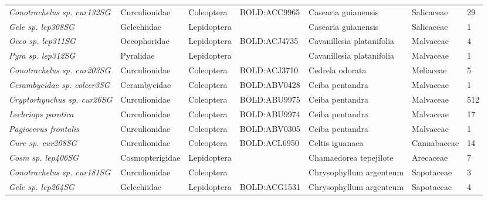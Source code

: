 \documentclass[11pt]{article}
\begin{document}
\begin{landscape}
\begin{longtable}{@{}lllllll@{}}
\textit{Conotrachelus sp. cur132SG}                   & Curculionidae   & Coleoptera   & BOLD:ACC9965 & Casearia guianensis                & Salicaceae       & 29    \\
\textit{Gele sp. lep308SG}                            & Gelechiidae     & Lepidoptera  &              & Casearia guianensis                & Salicaceae       & 1     \\
\textit{Oeco sp. lep311SG}                            & Oecophoridae    & Lepidoptera  & BOLD:ACJ4735 & Cavanillesia platanifolia          & Malvaceae        & 4     \\
\textit{Pyra sp. lep312SG}                            & Pyralidae       & Lepidoptera  &              & Cavanillesia platanifolia          & Malvaceae        & 1     \\
\textit{Conotrachelus sp. cur203SG}                   & Curculionidae   & Coleoptera   & BOLD:ACJ3710 & Cedrela odorata                    & Meliaceae        & 5     \\
\textit{Cerambycidae sp. colcer3SG}                   & Cerambycidae    & Coleoptera   & BOLD:ABV0428 & Ceiba pentandra                    & Malvaceae        & 1     \\
\textit{Cryptorhynchus sp. cur26SG}                   & Curculionidae   & Coleoptera   & BOLD:ABU9975 & Ceiba pentandra                    & Malvaceae        & 512   \\
\textit{Lechriops parotica}                           & Curculionidae   & Coleoptera   & BOLD:ABU9974 & Ceiba pentandra                    & Malvaceae        & 17    \\
\textit{Pagiocerus frontalis}                         & Curculionidae   & Coleoptera   & BOLD:ABV0305 & Ceiba pentandra                    & Malvaceae        & 1     \\
\textit{Curc sp. cur208SG}                            & Curculionidae   & Coleoptera   & BOLD:ACL6950 & Celtis iguanaea                    & Cannabaceae      & 14    \\
\textit{Cosm sp. lep406SG}                            & Cosmopterigidae & Lepidoptera  &              & Chamaedorea tepejilote             & Arecaceae        & 7     \\
\textit{Conotrachelus sp. cur181SG}                   & Curculionidae   & Coleoptera   &              & Chrysophyllum argenteum            & Sapotaceae       & 3     \\
\textit{Gele sp. lep264SG}                            & Gelechiidae     & Lepidoptera  & BOLD:ACG1531 & Chrysophyllum argenteum            & Sapotaceae       & 4     \\

\end{longtable}
\end{landscape}
\end{document}
